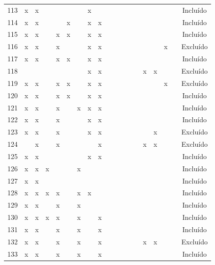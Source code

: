 \documentclass[
	12pt,				%
	oneside,			%
	a4paper,			%
	english,			%
	brazil				%
	]{abntex2ppgsi}
\begin{document}
\begin{apendicesenv}
\begin{table}[H]
\begin{tabular}{c | c c c c c c c c | c c c c c c c c c | c}
113 & x & x &   &   &   &   & x &   &   &   &   &   &   &   &   &   &   & Incluído \\
114 & x & x &   &   & x &   & x & x &   &   &   &   &   &   &   &   &   & Incluído \\
115 & x & x &   & x & x &   & x & x &   &   &   &   &   &   &   &   &   & Incluído \\
116 & x & x &   & x &   &   & x & x &   &   &   &   &   &   &   & x &   & Excluído \\
117 & x & x &   & x & x &   & x & x &   &   &   &   &   &   &   &   &   & Incluído \\
118 &   &   &   &   &   &   & x & x &   &   &   &   &   & x & x &   &   & Excluído \\
119 & x & x &   & x & x &   & x & x &   &   &   &   &   &   &   & x &   & Excluído \\
120 & x & x &   & x & x &   & x & x &   &   &   &   &   &   &   &   &   & Incluído \\
121 & x & x &   & x &   & x & x & x &   &   &   &   &   &   &   &   &   & Incluído \\
122 & x & x &   & x &   &   & x & x &   &   &   &   &   &   &   &   &   & Incluído \\
123 & x & x &   & x &   &   & x & x &   &   &   &   &   &   & x &   &   & Excluído \\
124 &   & x &   & x &   &   &   & x &   &   &   &   &   & x & x &   &   & Excluído \\
125 & x & x &   &   &   &   & x & x &   &   &   &   &   &   &   &   &   & Incluído \\
126 & x & x & x &   &   & x &   &   &   &   &   &   &   &   &   &   &   & Incluído \\
127 & x & x &   &   &   &   &   &   &   &   &   &   &   &   &   &   &   & Incluído \\
128 & x & x & x & x &   & x & x &   &   &   &   &   &   &   &   &   &   & Incluído \\
129 & x & x &   & x &   & x &   &   &   &   &   &   &   &   &   &   &   & Incluído \\
130 & x & x & x & x &   & x &   & x &   &   &   &   &   &   &   &   &   & Incluído \\
131 & x & x &   & x &   & x &   & x &   &   &   &   &   &   &   &   &   & Incluído \\
132 & x & x &   & x &   & x &   & x &   &   &   &   &   & x & x &   &   & Excluído \\
133 & x & x &   & x &   & x &   & x &   &   &   &   &   &   &   &   &   & Incluído \\

\end{tabular}
\end{table}
\end{apendicesenv}
\end{document}
